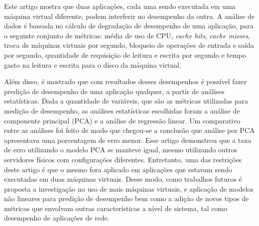 Este artigo mostra que duas aplicações, cada uma sendo executada em uma máquina virtual diferente, podem interferir no desempenho da outra. A análise de dados é baseada no cálculo de degradação de desempenho de uma aplicação, para o seguinte conjunto de métricas: média de uso de CPU, \textit{cache hits}, \textit{cache misses}, troca de máquinas virtuais por segundo, bloqueio de operações de entrada e saída por segundo, quantidade de requisição de leitura e escrita por segundo e tempo gasto na leitura e escrita para o disco da máquina virtual. %


Além disso, é mostrado que com resultados desses desempenhos é possível fazer predição de desempenho de uma aplicação qualquer, a partir de análises estatísticas. Dada a quantidade de variáveis, que são as métricas utilizadas para medição de desempenho, as análises estatísticas escolhidas foram a análise de componente principal (PCA) e a análise de regressão linear. Um comparativo entre as análises foi feito de modo que chegou-se a conclusão que análise por PCA apresentava uma porcentagem de erro menor. Esse artigo demonstrou que a taxa de erro utilizando o modelo PCA se manteve igual, mesmo utilizando outros servidores físicos com configurações diferentes. Entretanto, uma das restrições deste artigo é que o mesmo fora aplicado em aplicações que estavam sendo executadas em duas máquinas virtuais. Desse modo, como trabalhos futuros é proposta a investigação no uso de mais máquinas virtuais, e aplicação de modelos não lineares para predição de desempenho bem como a adição de novos tipos de métricas que envolvam outras características a nível de sistema, tal como desempenho de aplicações de rede.

